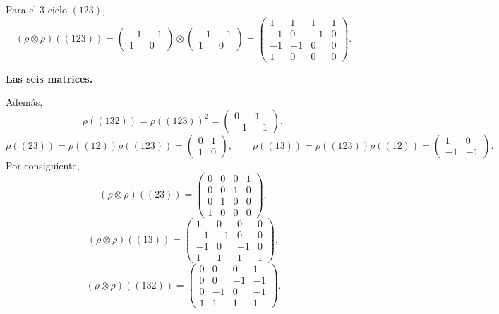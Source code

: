 \documentclass[10pt,a4paper]{article}
\begin{document}
Para el $3$-ciclo $(123)$,
\[
  (\rho\otimes\rho)((123))
  =
  \begin{pmatrix}
    -1 & -1 \\
    1 & 0
  \end{pmatrix}
  \otimes
  \begin{pmatrix}
    -1 & -1 \\
    1 & 0
  \end{pmatrix}
  =
  \begin{pmatrix}
    1 & 1 & 1 & 1 \\
    -1 & 0 & -1 & 0 \\
    -1 & -1 & 0 & 0 \\
    1 & 0 & 0 & 0
  \end{pmatrix}.
\]

\medskip
\textbf{Las seis matrices.}

Además,
\[
  \rho((132))=\rho((123))^2=
  \begin{pmatrix}
    0 & 1 \\
    -1 & -1
  \end{pmatrix},
\]
\[
  \rho((23))=\rho((12))\rho((123))=
  \begin{pmatrix}
    0 & 1 \\
    1 & 0
  \end{pmatrix},
  \qquad
  \rho((13))=\rho((123))\rho((12))=
  \begin{pmatrix}
    1 & 0 \\
    -1 & -1
  \end{pmatrix}.
\]
Por consiguiente,
\[
  (\rho\otimes\rho)((23))
  =
  \begin{pmatrix}
    0 & 0 & 0 & 1 \\
    0 & 0 & 1 & 0 \\
    0 & 1 & 0 & 0 \\
    1 & 0 & 0 & 0
  \end{pmatrix},
\]
\[
  (\rho\otimes\rho)((13))
  =
  \begin{pmatrix}
    1 & 0 & 0 & 0 \\
    -1 & -1 & 0 & 0 \\
    -1 & 0 & -1 & 0 \\
    1 & 1 & 1 & 1
  \end{pmatrix},
\]
\[
  (\rho\otimes\rho)((132))
  =
  \begin{pmatrix}
    0 & 0 & 0 & 1 \\
    0 & 0 & -1 & -1 \\
    0 & -1 & 0 & -1 \\
    1 & 1 & 1 & 1
  \end{pmatrix}.
\]
\end{document}

